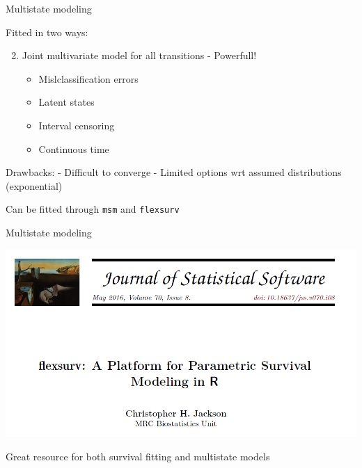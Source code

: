 \documentclass[
  ignorenonframetext,
]{beamer}
\providecommand{\tightlist}{%
  \setlength{\itemsep}{0pt}\setlength{\parskip}{0pt}}
\begin{document}
\begin{frame}[fragile]{Multistate modeling}
\protect\hypertarget{multistate-modeling-3}{}

Fitted in two ways:

\begin{enumerate}
\setcounter{enumi}{1}
\tightlist
\item
  Joint multivariate model for all transitions - Powerfull!

  \begin{itemize}
  \tightlist
  \item
    Mislclassification errors
  \item
    Latent states
  \item
    Interval censoring
  \item
    Continuous time
  \end{itemize}
\end{enumerate}

Drawbacks: - Difficult to converge - Limited options wrt assumed
distributions (exponential)

Can be fitted through \texttt{msm} and \texttt{flexsurv}

\end{frame}

\begin{frame}{Multistate modeling}
\protect\hypertarget{multistate-modeling-4}{}

\includegraphics[width=1\linewidth]{figures/jacksonflex}

Great resource for both survival fitting and multistate models

\end{frame}
\end{document}
